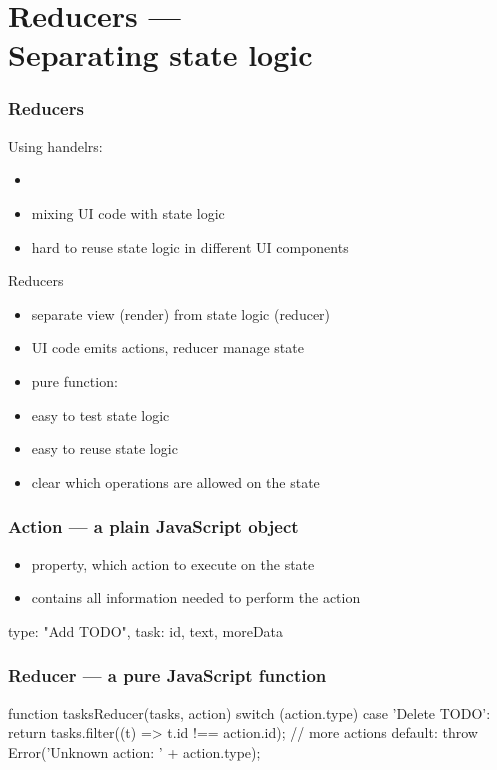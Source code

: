 \section{Reducers ---\\Separating state logic}

\begin{frame}[fragile] \frametitle{Reducers}
Using handelrs:
\begin{itemize}
  \item {}
  \item mixing UI code with state logic
  \item hard to reuse state logic in different UI components
\end{itemize}
\vspace{5mm}
Reducers
\begin{itemize}
  \item separate view (render) from state logic (reducer) 
  \item UI code emits actions, reducer manage state
  \item pure function: 
  \item easy to test state logic
  \item easy to reuse state logic
  \item clear which operations are allowed on the state
\end{itemize}
\end{frame}

\begin{frame}[fragile] \frametitle{Action --- a plain JavaScript object}
\begin{itemize}
  \item {} property, which action to execute on the state
  \item contains all information needed to perform the action
\end{itemize}
\vspace{5mm}
\begin{CodeBox}{}
{
  type: "Add TODO",
  task: { id, text, moreData}
}
\end{CodeBox}
\end{frame}

\begin{frame}[fragile] \frametitle{Reducer --- a pure JavaScript function}
\begin{CodeBox}{}
function tasksReducer(tasks, action) {
  switch (action.type) {
    case 'Delete TODO': {
      return tasks.filter((t) => t.id !== action.id);
    }
    // more actions
    default: {
      throw Error('Unknown action: ' + action.type);
    }
  }
}
\end{CodeBox}
\end{frame}

